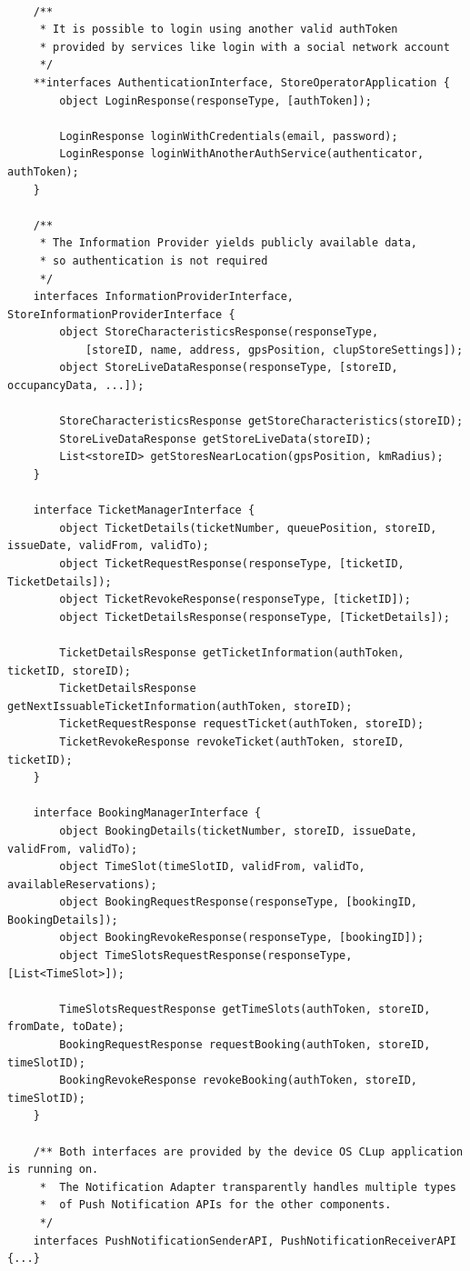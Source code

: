 \begin{lstlisting}
    
    /**
     * It is possible to login using another valid authToken 
     * provided by services like login with a social network account 
     */
    **interfaces AuthenticationInterface, StoreOperatorApplication {
        object LoginResponse(responseType, [authToken]);

        LoginResponse loginWithCredentials(email, password);
        LoginResponse loginWithAnotherAuthService(authenticator, authToken);
    }

    /**
     * The Information Provider yields publicly available data, 
     * so authentication is not required
     */
    interfaces InformationProviderInterface, StoreInformationProviderInterface {
        object StoreCharacteristicsResponse(responseType, 
            [storeID, name, address, gpsPosition, clupStoreSettings]);
        object StoreLiveDataResponse(responseType, [storeID, occupancyData, ...]);

        StoreCharacteristicsResponse getStoreCharacteristics(storeID);
        StoreLiveDataResponse getStoreLiveData(storeID);
        List<storeID> getStoresNearLocation(gpsPosition, kmRadius);
    }

    interface TicketManagerInterface {
        object TicketDetails(ticketNumber, queuePosition, storeID, issueDate, validFrom, validTo);
        object TicketRequestResponse(responseType, [ticketID, TicketDetails]);
        object TicketRevokeResponse(responseType, [ticketID]);
        object TicketDetailsResponse(responseType, [TicketDetails]);

        TicketDetailsResponse getTicketInformation(authToken, ticketID, storeID);
        TicketDetailsResponse getNextIssuableTicketInformation(authToken, storeID);
        TicketRequestResponse requestTicket(authToken, storeID);
        TicketRevokeResponse revokeTicket(authToken, storeID, ticketID);
    }

    interface BookingManagerInterface {
        object BookingDetails(ticketNumber, storeID, issueDate, validFrom, validTo);
        object TimeSlot(timeSlotID, validFrom, validTo, availableReservations);
        object BookingRequestResponse(responseType, [bookingID, BookingDetails]);
        object BookingRevokeResponse(responseType, [bookingID]);
        object TimeSlotsRequestResponse(responseType, [List<TimeSlot>]);

        TimeSlotsRequestResponse getTimeSlots(authToken, storeID, fromDate, toDate);
        BookingRequestResponse requestBooking(authToken, storeID, timeSlotID);
        BookingRevokeResponse revokeBooking(authToken, storeID, timeSlotID);
    }

    /** Both interfaces are provided by the device OS CLup application is running on.
     *  The Notification Adapter transparently handles multiple types 
     *  of Push Notification APIs for the other components.
     */
    interfaces PushNotificationSenderAPI, PushNotificationReceiverAPI {...}
\end{lstlisting}


